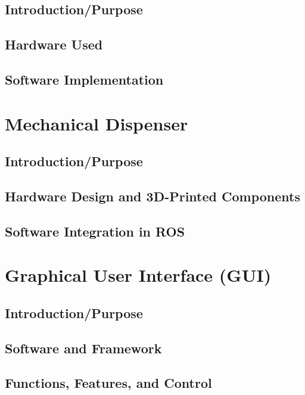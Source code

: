 \subsection{Introduction/Purpose}
\subsection{Hardware Used}
\subsection{Software Implementation}

\section{Mechanical Dispenser}
\subsection{Introduction/Purpose}
\subsection{Hardware Design and 3D-Printed Components}
\subsection{Software Integration in ROS}

\section{Graphical User Interface (GUI)}
\subsection{Introduction/Purpose}
\subsection{Software and Framework}
\subsection{Functions, Features, and Control}
